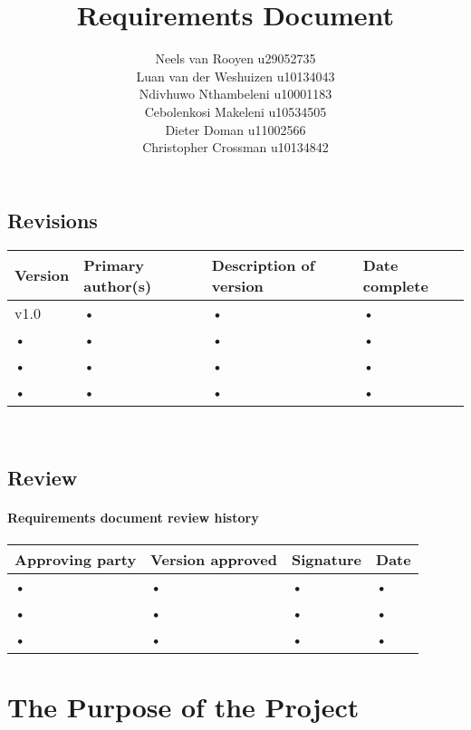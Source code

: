 \documentclass[12pt,a4paper]{article}
\begin{document}
\title{Requirements Document}
\author{Neels van Rooyen u29052735\\
Luan van der Weshuizen u10134043\\
Ndivhuwo Nthambeleni u10001183\\
Cebolenkosi Makeleni u10534505\\
Dieter Doman u11002566\\
Christopher Crossman u10134842}
\maketitle
\pagebreak
\begin{center}
\subsection*{Revisions}
\begin{tabular}{|p{2cm}|p{4cm}|p{4cm}|p{2cm}|}
\hline 
Version & Primary author(s) & Description of version & Date complete \\\hline
v1.0 & • & • & • \\ 
\hline 
• & • & • & • \\ 
\hline 
• & • & • & • \\ 
\hline 
• & • & • & • \\ 
\hline 
\end{tabular} \\
\end{center}
\begin{center}
\subsection*{Review}
\paragraph{Requirements document review history}
\begin{tabular}{|p{4cm}|p{4cm}|p{2cm}|p{2cm}|}
\hline 
Approving party & Version approved & Signature & Date \\\hline
• & • & • & • \\ 
\hline 
• & • & • & • \\ 
\hline 
• & • & • & • \\ 
\hline
\end{tabular} 
\end{center}
\section{The Purpose of the Project}
\end{document}
